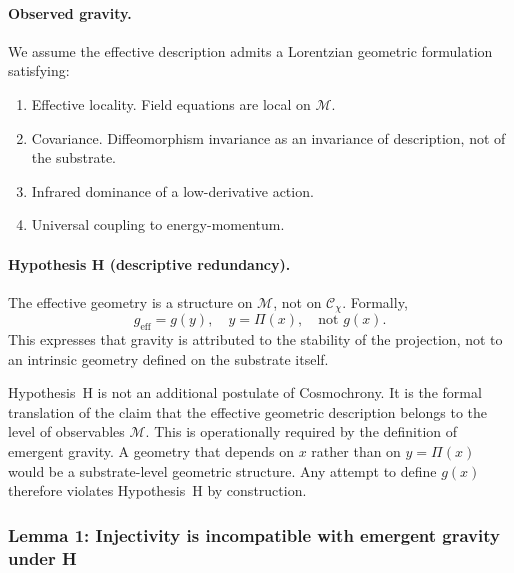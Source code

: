     \paragraph{Observed gravity.}
      We assume the effective description admits a Lorentzian geometric formulation satisfying:
    \begin{enumerate}[label=(D\arabic*)]
  \item \label{D1}
  Effective locality.
  Field equations are local on $\mathcal{M}$.
  \item \label{D2}
  Covariance.
  Diffeomorphism invariance as an invariance of description, not of the substrate.
  \item \label{D3}
  Infrared dominance of a low-derivative action.
  \item \label{D4}
  Universal coupling to energy-momentum.
      \end{enumerate}

    \paragraph{Hypothesis H (descriptive redundancy).}
      The effective geometry is a structure on $\mathcal{M}$, not on $\mathcal{C}_\chi$.
      Formally,
    \begin{equation}
      g_{\mathrm{eff}} = g(y),
      \quad
      y = \Pi(x),
      \quad
      \text{not } g(x).
      \label{eq:hypothesis-H}
      \end{equation}
      This expresses that gravity is attributed to the stability of the projection,
      not to an intrinsic geometry defined on the substrate itself.

    \begin{remark}
      Hypothesis~H is not an additional postulate of Cosmochrony.
      It is the formal translation of the claim that the effective geometric description belongs to
      the level of observables $\mathcal{M}$.
      This is operationally required by the definition of emergent gravity.
      A geometry that depends on $x$ rather than on $y = \Pi(x)$ would be a substrate-level geometric structure.
      Any attempt to define $g(x)$ therefore violates Hypothesis~H by construction.
      \end{remark}

  \subsubsection*{Lemma 1: Injectivity is incompatible with emergent gravity under H}
    \label{subsec:lemma1}

